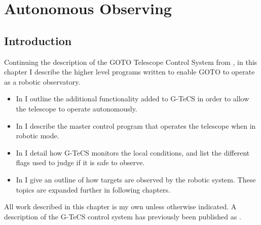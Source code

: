 \chapter{Autonomous Observing}
\label{chap:autonomous}
\chaptoc{}


\newpage
\section{Introduction}
\label{sec:autonomous_intro}
\begin{colsection}

Continuing the description of the GOTO Telescope Control System from , in this chapter I describe the higher level programs written to enable GOTO to operate as a robotic observatory.
%
\begin{itemize}
    \item In  I outline the additional functionality added to G-TeCS in order to allow the telescope to operate autonomously.
    \item In  I describe the master control program that operates the telescope when in robotic mode.
    \item In  I detail how G-TeCS monitors the local conditions, and list the different flags used to judge if it is safe to observe.
    \item In  I give an outline of how targets are observed by the robotic system. These topics are expanded further in following chapters.
\end{itemize}
%
All work described in this chapter is my own unless otherwise indicated. A description of the G-TeCS control system has previously been published as \citet{Dyer}.

\end{colsection}


\newpage
